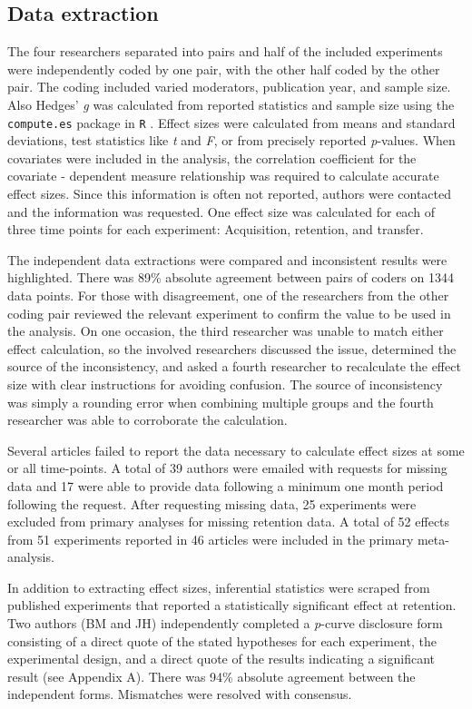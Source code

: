 \documentclass[man,floatsintext,hidelinks]{apa7}
\begin{document}
\subsection{Data extraction}
The four researchers separated into pairs and half of the included experiments were independently coded by one pair, with the other half coded by the other pair. The coding included varied moderators, publication year, and sample size. Also Hedges’ \emph{g} was calculated from reported statistics and sample size using the \texttt{compute.es} package in \texttt{R} \parencite{DelRe2013-es}. Effect sizes were calculated from means and standard deviations, test statistics like \emph{t} and \emph{F}, or from precisely reported \emph{p}-values. When covariates were included in the analysis, the correlation coefficient for the covariate - dependent measure relationship was required to calculate accurate effect sizes. Since this information is often not reported, authors were contacted and the information was requested. One effect size was calculated for each of three time points for each experiment: Acquisition, retention, and transfer.

The independent data extractions were compared and inconsistent results were highlighted. There was 89\% absolute agreement between pairs of coders on 1344 data points. For those with disagreement, one of the researchers from the other coding pair reviewed the relevant experiment to confirm the value to be used in the analysis. On one occasion, the third researcher was unable to match either effect calculation, so the involved researchers discussed the issue, determined the source of the inconsistency, and asked a fourth researcher to recalculate the effect size with clear instructions for avoiding confusion. The source of inconsistency was simply a rounding error when combining multiple groups and the fourth researcher was able to corroborate the calculation.

Several articles failed to report the data necessary to calculate effect sizes at some or all time-points. A total of 39 authors were emailed with requests for missing data and 17 were able to provide data following a minimum one month period following the request. After requesting missing data, 25 experiments were excluded from primary analyses for missing retention data. A total of 52 effects from 51 experiments reported in 46 articles were included in the primary meta-analysis.

In addition to extracting effect sizes, inferential statistics were scraped from published experiments that reported a statistically significant effect at retention. Two authors (BM and JH) independently completed a \emph{p}-curve disclosure form consisting of a direct quote of the stated hypotheses for each experiment, the experimental design, and a direct quote of the results indicating a significant result (see Appendix A). There was 94\% absolute agreement between the independent forms. Mismatches were resolved with consensus.
\end{document}
